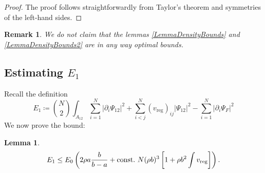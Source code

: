 \documentclass[a4paper,11pt]{article}
\newcommand{\abs}[1]{\left\lvert #1 \right\rvert}
\newtheorem{lemma}[theorem]{Lemma}
\newtheorem{remark}[theorem]{Remark}
\numberwithin{equation}{section}
\begin{document}
	\begin{proof}
		The proof follows straightforwardly from Taylor's theorem and symmetries of the left-hand sides. 
	\end{proof}
	\begin{remark}
		We do not claim that the lemmas \ref{LemmaDensityBounds} and \ref{LemmaDensityBounds2} are in any way optimal bounds.
	\end{remark}
	\subsection{Estimating $ E_1 $}
		Recall the definition \begin{equation}
		E_1\coloneqq\binom{N}{2}\int_{A_{12}} \sum_{i=1}^{N}\abs{\partial_i\Psi_{12}}^2+\sum_{i<j}^{N}(v_{\text{reg}})_{ij}\abs{\Psi_{12}}^2-\sum_{i=1}^{N}\abs{\partial_i\Psi_F}^2
		\end{equation}
		We now prove the bound: \begin{lemma}\label{LemmaE1Bound}
			\begin{equation}
			E_1\leq E_0 \left(2\rho a\frac{b}{b-a}+ \textnormal{const.}\ N(\rho b)^3\left[ 1+ \rho b^2\int v_{\textnormal{reg}}\right]\right).
			\end{equation}
		\end{lemma}
\end{document}
